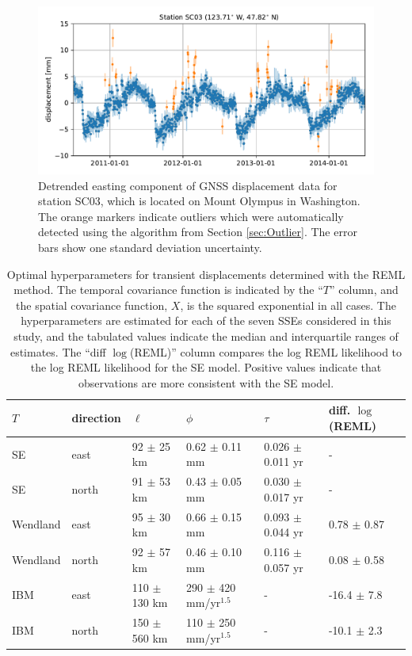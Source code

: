 \documentclass[10pt,letter]{article}
\begin{document}
\begin{figure}
\includegraphics{figures/outliers/outliers.pdf}
\caption{Detrended easting component of GNSS displacement data for station SC03, which is located on Mount Olympus in Washington.  The orange markers indicate outliers which were automatically detected using the algorithm from Section \ref{sec:Outlier}. The error bars show one standard deviation uncertainty.}   
\label{fig:Outliers}
\end{figure}

\begin{table}\label{tab:Parameters}
\begin{tabular} {l l l l l l}
$T$ & direction & $\ell$  & $\phi$   & $\tau$  & diff. $\log$(REML) \\ \hline
SE & east   & 92 $\pm$ 25 km  & 0.62 $\pm$ 0.11 mm  & 0.026 $\pm$ 0.011 yr  &  - \\
SE & north  & 91 $\pm$ 53 km  & 0.43 $\pm$ 0.05 mm  & 0.030 $\pm$ 0.017 yr  &  - \\
Wendland & east   & 95 $\pm$ 30 km  & 0.66 $\pm$ 0.15 mm  & 0.093 $\pm$ 0.044 yr &  0.78 $\pm$ 0.87 \\
Wendland & north  & 92 $\pm$ 57 km  & 0.46 $\pm$ 0.10 mm  & 0.116 $\pm$ 0.057 yr &  0.08 $\pm$ 0.58 \\
IBM & east   & 110 $\pm$ 130 km & 290 $\pm$ 420 mm/yr$^{1.5}$  & -          & -16.4 $\pm$ 7.8 \\
IBM & north  & 150 $\pm$ 560 km & 110 $\pm$ 250 mm/yr$^{1.5}$ & -           & -10.1 $\pm$ 2.3 \\
\end{tabular}
\caption{Optimal hyperparameters for transient displacements determined with the REML method.  The temporal covariance function is indicated by the ``$T$'' column, and the spatial covariance function, $X$, is the squared exponential in all cases. The hyperparameters are estimated for each of the seven SSEs considered in this study, and the tabulated values indicate the median and interquartile ranges of estimates. The ``diff $\log$(REML)'' column compares the log REML likelihood to the log REML likelihood for the SE model. Positive values indicate that observations are more consistent with the SE model.} 
\end{table}
\end{document}
